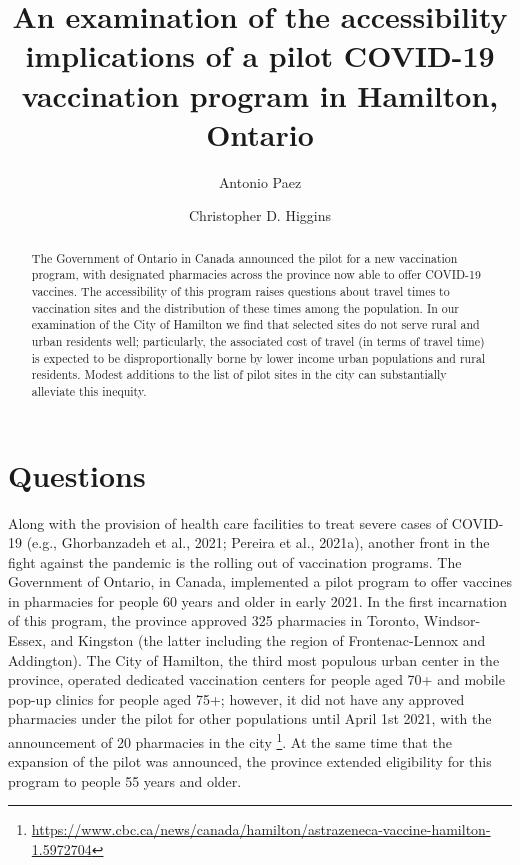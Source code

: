\documentclass[]{elsarticle} %
\begin{document}
\begin{frontmatter}

  \title{An examination of the accessibility implications of a pilot
COVID-19 vaccination program in Hamilton, Ontario}
    \author[McMaster University]{Antonio Paez}
    \author[University of Toronto Scarborough]{Christopher D. Higgins}
      \address[McMaster University]{School of Earth, Environment and
Society, McMaster University, Hamilton, ON, L8S 4K1, Canada}
    \address[University of Toronto Scarborough]{Department of Geography
\& Planning, University of Toronto Scarborough, 1265 Military Trail,
Toronto, ON M1C1A4}
  
  \begin{abstract}
  The Government of Ontario in Canada announced the pilot for a new
  vaccination program, with designated pharmacies across the province
  now able to offer COVID-19 vaccines. The accessibility of this program
  raises questions about travel times to vaccination sites and the
  distribution of these times among the population. In our examination
  of the City of Hamilton we find that selected sites do not serve rural
  and urban residents well; particularly, the associated cost of travel
  (in terms of travel time) is expected to be disproportionally borne by
  lower income urban populations and rural residents. Modest additions
  to the list of pilot sites in the city can substantially alleviate
  this inequity.
  \end{abstract}
  
 \end{frontmatter}

\hypertarget{questions}{%
\section{Questions}\label{questions}}

Along with the provision of health care facilities to treat severe cases
of COVID-19 (e.g., Ghorbanzadeh et al., 2021; Pereira et al., 2021a),
another front in the fight against the pandemic is the rolling out of
vaccination programs. The Government of Ontario, in Canada, implemented
a pilot program to offer vaccines in pharmacies for people 60 years and
older in early 2021. In the first incarnation of this program, the
province approved 325 pharmacies in Toronto, Windsor-Essex, and Kingston
(the latter including the region of Frontenac-Lennox and Addington). The
City of Hamilton, the third most populous urban center in the province,
operated dedicated vaccination centers for people aged 70+ and mobile
pop-up clinics for people aged 75+; however, it did not have any
approved pharmacies under the pilot for other populations until April
1st 2021, with the announcement of 20 pharmacies in the city
\footnote{\url{https://www.cbc.ca/news/canada/hamilton/astrazeneca-vaccine-hamilton-1.5972704}}.
At the same time that the expansion of the pilot was announced, the
province extended eligibility for this program to people 55 years and
older.
\end{document}
